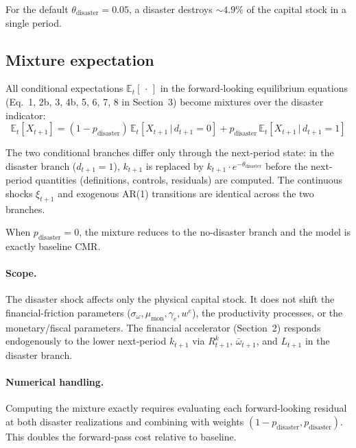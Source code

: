 For the default $\theta_{\text{disaster}} = 0.05$, a disaster destroys
${\sim}4.9\%$ of the capital stock in a single period.

\subsection{Mixture expectation}

All conditional expectations $\mathbb{E}_t[\,\cdot\,]$ in the
forward-looking equilibrium equations (Eq.~1, 2b, 3, 4b, 5, 6, 7, 8 in
Section~3) become mixtures over the disaster indicator:
\begin{equation*}
  \boxed{\mathds{E}_t[X_{t+1}]
    = (1 - p_{\text{disaster}})\,
      \mathds{E}_t\!\left[X_{t+1} \,\big|\, d_{t+1} = 0\right]
    + p_{\text{disaster}}\,
      \mathds{E}_t\!\left[X_{t+1} \,\big|\, d_{t+1} = 1\right]}
\end{equation*}

The two conditional branches differ only through the next-period
state: in the disaster branch ($d_{t+1} = 1$), $k_{t+1}$ is replaced by
$k_{t+1} \cdot e^{-\theta_{\text{disaster}}}$ before the next-period
quantities (definitions, controls, residuals) are computed. The
continuous shocks $\xi_{t+1}$ and exogenous AR(1) transitions are
identical across the two branches.

When $p_{\text{disaster}} = 0$, the mixture reduces to the no-disaster
branch and the model is exactly baseline CMR.

\paragraph{Scope.}
The disaster shock affects only the physical capital stock. It does not
shift the financial-friction parameters ($\sigma_\omega, \mu_{\text{mon}},
\gamma_e, w^e$), the productivity processes, or the monetary/fiscal
parameters. The financial accelerator (Section~2) responds endogenously
to the lower next-period $k_{t+1}$ via $R^k_{t+1}$, $\bar\omega_{t+1}$,
and $L_{t+1}$ in the disaster branch.

\paragraph{Numerical handling.}
Computing the mixture exactly requires evaluating each forward-looking
residual at both disaster realizations and combining with weights
$(1 - p_{\text{disaster}}, p_{\text{disaster}})$. This doubles the
forward-pass cost relative to baseline.


